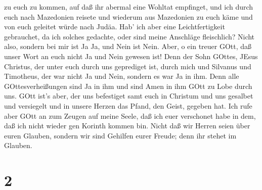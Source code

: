 zu euch zu kommen, auf daß ihr abermal eine Wohltat empfinget,
 und ich durch euch nach Mazedonien reisete und wiederum
aus Mazedonien zu euch käme und von euch geleitet würde nach Judäa.
 Hab' ich aber eine Leichtfertigkeit gebrauchet, da ich
solches gedachte, oder sind meine Anschläge fleischlich? Nicht also,
sondern bei mir ist Ja Ja, und Nein ist Nein.  Aber, o ein
treuer GOtt, daß unser Wort an euch nicht Ja und Nein gewesen ist!
 Denn der Sohn GOttes, JEsus Christus, der unter euch durch
uns geprediget ist, durch mich und Silvanus und Timotheus, der war nicht
Ja und Nein, sondern es war Ja in ihm.  Denn alle
GOttesverheißungen sind Ja in ihm und sind Amen in ihm GOtt zu Lobe
durch uns.  GOtt ist's aber, der uns befestiget samt euch
in Christum und uns gesalbet  und versiegelt und in unsere
Herzen das Pfand, den Geist, gegeben hat.  Ich rufe aber
GOtt an zum Zeugen auf meine Seele, daß ich euer verschonet habe in dem,
daß ich nicht wieder gen Korinth kommen bin.  Nicht daß wir
Herren seien über euren Glauben, sondern wir sind Gehilfen eurer Freude;
denn ihr stehet im Glauben.

\hypertarget{section-1}{%
\section{2}\label{section-1}}

